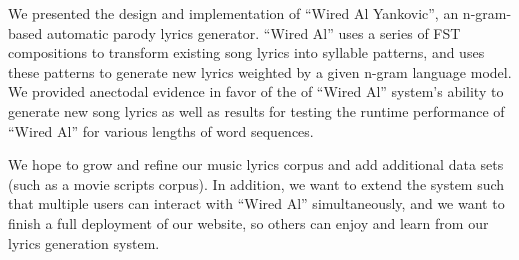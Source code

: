 \documentclass{vgtc}                          %
\begin{document}
We presented the design and implementation of ``Wired Al Yankovic'',
an n-gram-based automatic parody lyrics generator. ``Wired Al''
uses a series of FST compositions to transform existing
song lyrics into syllable patterns, and uses these patterns
to generate new lyrics weighted by a given n-gram language model.
We provided anectodal evidence in favor of the of ``Wired Al''
system's ability to generate new song lyrics as well as results
for testing the runtime performance of ``Wired Al'' for
various lengths of word sequences.

We hope to grow and refine our music lyrics corpus and add additional
data sets (such as a movie scripts corpus). In addition, we want
to extend the system such that multiple users can interact with
``Wired Al'' simultaneously, and we want to finish a full deployment
of our website, so others can enjoy and learn from our lyrics generation
system.

%


\end{document}
